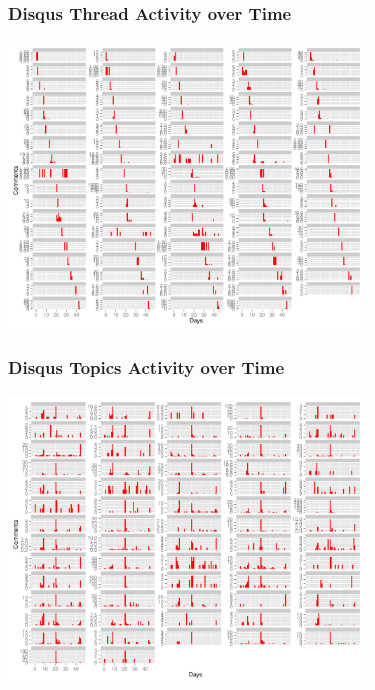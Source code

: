 \documentclass{beamer}
\begin{document}

\begin{frame}\frametitle{Disqus Thread Activity over Time}
  \begin{center}
    \includegraphics[width=9.5cm]{./imgs/DT_timebythread.pdf}
  \end{center}
\end{frame}

\begin{frame}\frametitle{Disqus Topics Activity over Time}
  \begin{center}
    \includegraphics[width=9.5cm]{./imgs/DT_timebycluster.pdf}
  \end{center}
\end{frame}
\end{document}
